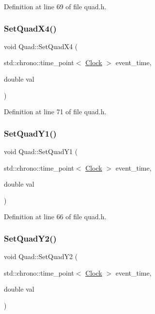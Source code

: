 Definition at line 69 of file quad.\+h.

\mbox{\label{class_quad_ac49d711fa31a12ba24ad65c959c74e05}} 
\subsubsection{\texorpdfstring{Set\+Quad\+X4()}{SetQuadX4()}}
{\footnotesize\ttfamily void Quad\+::\+Set\+Quad\+X4 (\begin{DoxyParamCaption}\item[{std\+::chrono\+::time\+\_\+point$<$ \hyperlink{universe_8h_a0ef8d951d1ca5ab3cfaf7ab4c7a6fd80}{Clock} $>$}]{event\+\_\+time,  }\item[{double}]{val }\end{DoxyParamCaption})\hspace{0.3cm}{\ttfamily [inline]}}



Definition at line 71 of file quad.\+h.

\mbox{\label{class_quad_a3f0f9162be2b1ec2e2597a163586fb01}} 
\subsubsection{\texorpdfstring{Set\+Quad\+Y1()}{SetQuadY1()}}
{\footnotesize\ttfamily void Quad\+::\+Set\+Quad\+Y1 (\begin{DoxyParamCaption}\item[{std\+::chrono\+::time\+\_\+point$<$ \hyperlink{universe_8h_a0ef8d951d1ca5ab3cfaf7ab4c7a6fd80}{Clock} $>$}]{event\+\_\+time,  }\item[{double}]{val }\end{DoxyParamCaption})\hspace{0.3cm}{\ttfamily [inline]}}



Definition at line 66 of file quad.\+h.

\mbox{\label{class_quad_afcec579c40a3763c34d1ace417888bf9}} 
\subsubsection{\texorpdfstring{Set\+Quad\+Y2()}{SetQuadY2()}}
{\footnotesize\ttfamily void Quad\+::\+Set\+Quad\+Y2 (\begin{DoxyParamCaption}\item[{std\+::chrono\+::time\+\_\+point$<$ \hyperlink{universe_8h_a0ef8d951d1ca5ab3cfaf7ab4c7a6fd80}{Clock} $>$}]{event\+\_\+time,  }\item[{double}]{val }\end{DoxyParamCaption})\hspace{0.3cm}{\ttfamily [inline]}}



